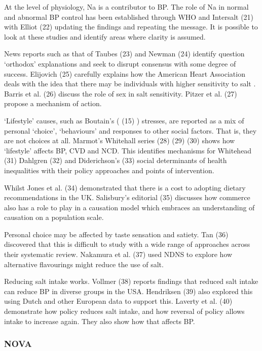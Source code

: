 \documentclass[
]{article}
\begin{document}
At the level of physiology, Na is a contributor to BP. The role of Na in
normal and abnormal BP control has been established through WHO and
Intersalt (21) with Elliot (22) updating the findings and repeating the
message. It is possible to look at these studies and identify areas
where clarity is assumed.

News reports such as that of Taubes (23) and Newman (24) identify
question `orthodox' explanations and seek to disrupt consensus with some
degree of success. Elijovich (25) carefully explains how the American
Heart Association deals with the idea that there may be individuals with
higher sensitivity to salt . Barris et al. (26) discuss the role of sex
in salt sensitivity. Pitzer et al. (27) propose a mechanism of action.

`Lifestyle' causes, such as Boutain's ( (15) ) stresses, are reported as
a mix of personal `choice', `behaviours' and responses to other social
factors. That is, they are not choices at all. Marmot's Whitehall series
(28) (29) (30) shows how `lifestyle' affects BP, CVD and NCD. This
identifies mechanisms for Whitehead (31) Dahlgren (32) and Diderichson's
(33) social determinants of health inequalities with their policy
approaches and points of intervention.

Whilst Jones et al. (34) demonstrated that there is a cost to adopting
dietary recommendations in the UK. Salisbury's editorial (35) discusses
how commerce also has a role to play in a causation model which embraces
an understanding of causation on a population scale.

Personal choice may be affected by taste sensation and satiety. Tan (36)
discovered that this is difficult to study with a wide range of
approaches across their systematic review. Nakamura et al. (37) used
NDNS to explore how alternative flavourings might reduce the use of
salt.

Reducing salt intake works. Vollmer (38) reports findings that reduced
salt intake can reduce BP in diverse groups in the USA. Hendriksen (39)
also explored this using Dutch and other European data to support this.
Laverty et al. (40) demonstrate how policy reduces salt intake, and how
reversal of policy allows intake to increase again. They also show how
that affects BP.

\hypertarget{nova}{%
\subsubsection{NOVA}\label{nova}}
\end{document}
